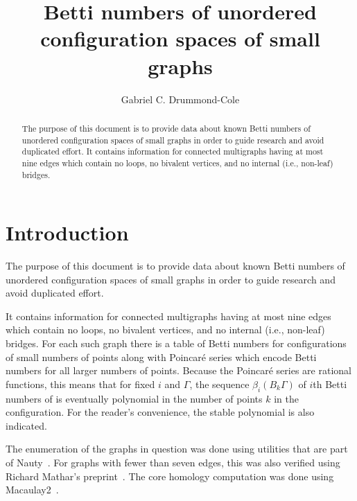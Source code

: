 \documentclass{amsart}
\title{Betti numbers of unordered configuration spaces of small graphs}
\author{Gabriel C. Drummond-Cole}
\theoremstyle{definition}
\begin{document}
\begin{abstract}
The purpose of this document is to provide data about known Betti numbers of unordered configuration spaces of small graphs in order to guide research and avoid duplicated effort.
It contains information for connected multigraphs having at most nine edges which contain no loops, no bivalent vertices, and no internal (i.e., non-leaf) bridges.
\end{abstract}
\maketitle
\section*{Introduction}
The purpose of this document is to provide data about known Betti numbers of unordered configuration spaces of small graphs in order to guide research and avoid duplicated effort.

It contains information for connected multigraphs having at most nine edges which contain no loops, no bivalent vertices, and no internal (i.e., non-leaf) bridges.
For each such graph there is a table of Betti numbers for configurations of small numbers of points along with Poincar\'e series which encode Betti numbers for all larger numbers of points. 
Because the Poincar\'e series are rational functions, this means that for fixed $i$ and $\Gamma$, the sequence $\beta_i (B_k\Gamma)$ of $i$th Betti numbers of is eventually polynomial in the number of points $k$ in the configuration. 
For the reader's convenience, the stable polynomial is also indicated.

The enumeration of the graphs in question was done using utilities that are part of Nauty~\cite{McKayPiperno:PCIII}.
For graphs with fewer than seven edges, this was also verified using Richard Mathar's preprint~\cite[Table 61]{Mathar:SSG}. 
The core homology computation was done using Macaulay2~\cite{GraysonStillman:M2}. 
\end{document}
